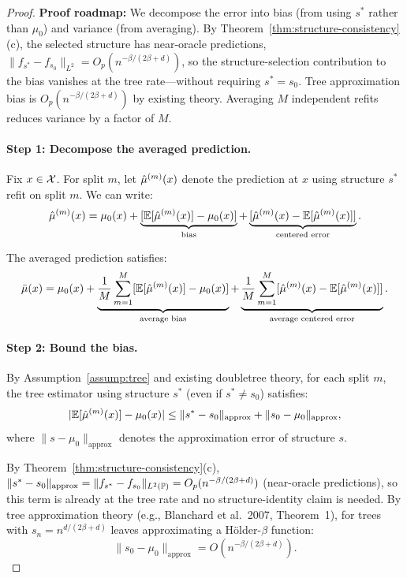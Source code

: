 \documentclass[12pt]{article}
\begin{document}
\begin{proof}
\textbf{Proof roadmap:} We decompose the error into bias (from using $s^*$ rather than $\mu_0$) and variance (from averaging). By Theorem~\ref{thm:structure-consistency}(c), the selected structure has near-oracle predictions, $\|f_{s^*}-f_{s_0}\|_{L^2}=O_p(n^{-\beta/(2\beta+d)})$, so the structure-selection contribution to the bias vanishes at the tree rate---without requiring $s^*=s_0$. Tree approximation bias is $O_p(n^{-\beta/(2\beta+d)})$ by existing theory. Averaging $M$ independent refits reduces variance by a factor of $M$.

\paragraph{Step 1: Decompose the averaged prediction.}
Fix $x \in \mathcal{X}$. For split $m$, let $\hat{\mu}^{(m)}(x)$ denote the prediction at $x$ using structure $s^*$ refit on split $m$. We can write:
\[
\hat{\mu}^{(m)}(x) = \mu_0(x) + \underbrace{[\mathbb{E}[\hat{\mu}^{(m)}(x)] - \mu_0(x)]}_{\text{bias}} + \underbrace{[\hat{\mu}^{(m)}(x) - \mathbb{E}[\hat{\mu}^{(m)}(x)]]}_{\text{centered error}}.
\]

The averaged prediction satisfies:
\[
\bar{\mu}(x) = \mu_0(x) + \underbrace{\frac{1}{M} \sum_{m=1}^M [\mathbb{E}[\hat{\mu}^{(m)}(x)] - \mu_0(x)]}_{\text{average bias}} + \underbrace{\frac{1}{M} \sum_{m=1}^M [\hat{\mu}^{(m)}(x) - \mathbb{E}[\hat{\mu}^{(m)}(x)]]}_{\text{average centered error}}.
\]

\paragraph{Step 2: Bound the bias.}
By Assumption~\ref{assump:tree} and existing doubletree theory, for each split $m$, the tree estimator using structure $s^*$ (even if $s^* \ne s_0$) satisfies:
\[
|\mathbb{E}[\hat{\mu}^{(m)}(x)] - \mu_0(x)| \le \|s^* - s_0\|_{\text{approx}} + \|s_0 - \mu_0\|_{\text{approx}},
\]
where $\|s - \mu_0\|_{\text{approx}}$ denotes the approximation error of structure $s$.

By Theorem~\ref{thm:structure-consistency}(c), $\|s^* - s_0\|_{\text{approx}} = \|f_{s^*}-f_{s_0}\|_{L^2(\mathbb{P})} = O_p(n^{-\beta/(2\beta+d)})$ (near-oracle predictions), so this term is already at the tree rate and no structure-identity claim is needed. By tree approximation theory (e.g., Blanchard et al.\ 2007, Theorem~1), for trees with $s_n = n^{d/(2\beta+d)}$ leaves approximating a H\"older-$\beta$ function:
\[
\|s_0 - \mu_0\|_{\text{approx}} = O(n^{-\beta/(2\beta+d)}).
\]


\end{proof}
\end{document}
